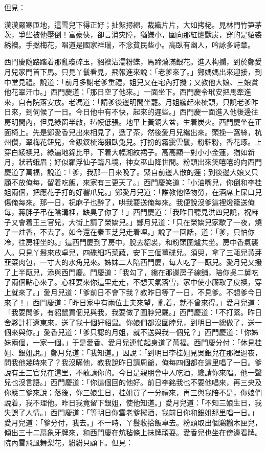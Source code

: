 \begin{showcontents}{}
但見：

漠漠嚴寒匝地，這雪兒下得正好；扯絮撏綿，裁織片片，大如拷栳。見林門竹笋茅茨，爭些被他壓倒！富豪俠，卻言消灾障，猶嫌小，圍向那紅爐獸炭，穿的是貂裘綉襖。手撚梅花，唱道是國家祥瑞，不念貧民些小。高臥有幽人，吟詠多詩章。

西門慶隨路踏着那亂瓊碎玉，貂襖沾濡粉蝶，馬蹄蕩滿銀花。進入构攔，到於鄭愛月兒家門首下馬。只見丫鬟看見，飛報進來說：「老爹來了。」鄭媽媽出來迎接，到中堂見禮。說道：「前月多謝老爹重禮，姐兒又在宅內打攪；又教他大娘、三娘賞他花翠汗巾。」西門慶道：「那日空了他來。」一面坐下。西門慶令玳安把馬牽進來，自有院落安放。老馮道：「請爹後邊明間坐罷。月姐纔起來梳頭，只說老爹昨日來，到伺候了一日。今日他中有不快，起來的遲些。」西門慶一面進入他後邊往房明間內，但見綠窗半啟，毡幙低張。地平上黃銅大盆，生着炭火。西門慶坐在正面椅上。先是鄭愛香兒出來相見了，遞了茶，然後愛月兒纔出來。頭挽一窩絲，杭州儹，翠梅花鈕兒，金鈒釵梳海獺臥兔兒。打扮的霧靄雲鬟，粉粧粉，香花琢。上穿白綾襖兒，綠遍地錦比甲，下着大幅湘紋裙子。高高顯一對小小金蓮，猶如新月，狀若蛾眉；好似羅浮仙子臨凡境，神女巫山降世間。粉頭出來笑嘻嘻的向西門慶道了萬福，說道：「爹，我那一日來晚了。緊自前邊人散的遲；到後邊大娘又只顧不放俺每，留着吃飯，來家有三更天了。」西門慶笑道：「小油嘴兒，你倒和李桂姐兩個，把應花子打的好響爪兒。」鄭愛月兒道：「誰教他怪物勞，在酒席上屎口兒傷俺每來。那一日，祝麻子也醉了，哄我要送俺每來。我便說沒爹這裡燈籠送俺每，蔣胖子弔在陰溝裡，缺臭了你了！」西門慶道：「我昨日聽見洪四兒說，祝麻子又會着王三官兒，大街上請了榮嬌兒。」鄭月兒道：「只在榮嬌兒家歇了一夜，燒了一炷香，不去了。如今還在秦玉芝兒走着哩。」說了一回話，道：「爹，只怕你冷，往房裡坐的。」這西門慶到了房中，脫去貂裘，和粉頭圍爐共坐。房中香氣襲人。只見丫鬟來放卓兒，四碟細巧菜蔬，安下三個薑碟兒。須臾，拿了三甌兒黃芽韮菜肉包，一寸大的水角兒來。姊妹二人陪西門慶，每人吃了一甌兒。愛月兒又撥了上半甌兒，添與西門慶。門慶道：「我勾了，纔在那邊房子線舖，陪你吳二舅吃了兩個點心來了。心裡要來你這里走走，不想天氣落雪，家中使小廝取了皮襖，穿上就來了。」愛月兒道：「爹前日不會下我？教昨日等了一日，不見爹。不想爹今日來了！」西門慶道：「昨日家中有兩位士夫來望，亂着，就不曾來得。」愛月兒道：「我要問爹，有貂鼠買個兒與我，我要做了圍脖兒戴。」西門慶道：「不打緊。昨日舍夥計打遼東來，送了我十個好貂鼠。你娘們都沒圍脖兒，到明日一總做了，送一個來與你。」愛香兒道：「爹只認的月姐，就不送與我一個兒？」西門慶道：「你姊妹兩個，一家一個。」于是愛香、愛月兒連忙起身道了萬福。西門慶分付：「休見桂姐、銀姐說。」鄭月兒道：「我知道。」因說：「到明日李桂姐見吳銀兒在那裡過夜，問我他幾時來了？我沒瞞他，教我說昨日請周爺，俺每四個都在這里唱了一日。爹說有王三官兒在這里，不敢請你的。今日是親朋會中人吃酒，纔請你來唱。他一聲兒也沒言語。」西門慶道：「你這個回的他好。前日李銘我也不要他唱來，再三央及你應二爹來說；落後，你三娘生日，桂姐買了一分禮來，再三與我陪不是，你娘們說着，我不理他。昨日我竟留下銀姐，使他知道。」愛月兒道：「不知三娘生日，我失誤了人情。」西門慶道：「等明日你雲老爹擺酒，我前日你和銀姐那里唱一日。」愛月兒道：「爹分付，我去。」不一時，丫鬟收拾飯卓去。粉頭取出個鸂鶒木匣兒，傾出三十二扇象牙牌來，和西門慶在炕毡條上抹牌頑耍。愛香兒也坐在傍邊看牌。院內雪飛風舞梨花，紛紛只顧下。但見：


\end{showcontents}
